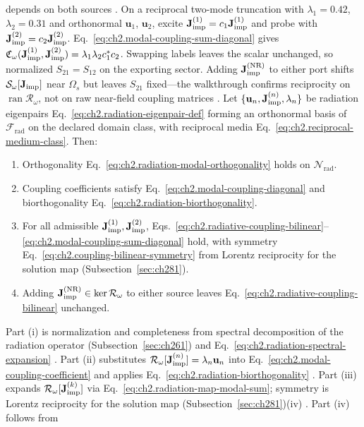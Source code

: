 depends on both sources \cite{stratton1941}. On a reciprocal two-mode truncation with $\lambda_1=0.42$, $\lambda_2=0.31$ and orthonormal $\mathbf{u}_1$, $\mathbf{u}_2$, excite $\mathbf{J}_{\mathrm{imp}}^{(1)}=c_1\mathbf{J}^{(1)}_{\mathrm{imp}}$ and probe with $\mathbf{J}_{\mathrm{imp}}^{(2)}=c_2\mathbf{J}^{(2)}_{\mathrm{imp}}$. Eq.~\eqref{eq:ch2.modal-coupling-sum-diagonal} gives $\mathfrak{C}_\omega(\mathbf{J}_{\mathrm{imp}}^{(1)},\mathbf{J}_{\mathrm{imp}}^{(2)})=\lambda_1\lambda_2 c_1^* c_2$. Swapping labels leaves the scalar unchanged, so normalized $S_{21}=S_{12}$ on the exporting sector. Adding $\mathbf{J}_{\mathrm{imp}}^{\mathrm{(NR)}}$ to either port shifts $\mathcal{S}_\omega[\mathbf{J}_{\mathrm{imp}}]$ near $\Omega_s$ but leaves $S_{21}$ fixed---the walkthrough confirms reciprocity on $\operatorname{ran}\mathcal{R}_\omega$, not on raw near-field coupling matrices \cite{stratton1941}.
\label{thm:ch2.radiation-modal-orthogonality-coupling}
Let \(\{\mathbf{u}_n,\mathbf{J}_{\mathrm{imp}}^{(n)},\lambda_n\}\) be radiation eigenpairs
Eq.~\eqref{eq:ch2.radiation-eigenpair-def} forming an orthonormal basis of
\(\mathcal{F}_{\mathrm{rad}}\) on the declared domain class, with reciprocal media
Eq.~\eqref{eq:ch2.reciprocal-medium-class}. Then:
\begin{enumerate}
\item[(i)] Orthogonality Eq.~\eqref{eq:ch2.radiation-modal-orthogonality} holds on
\(\mathcal{N}_{\mathrm{rad}}\).
\item[(ii)] Coupling coefficients satisfy Eq.~\eqref{eq:ch2.modal-coupling-diagonal} and
biorthogonality Eq.~\eqref{eq:ch2.radiation-biorthogonality}.
\item[(iii)] For all admissible \(\mathbf{J}_{\mathrm{imp}}^{(1)},\mathbf{J}_{\mathrm{imp}}^{(2)}\),
Eqs.~\eqref{eq:ch2.radiative-coupling-bilinear}--\eqref{eq:ch2.modal-coupling-sum-diagonal}
hold, with symmetry Eq.~\eqref{eq:ch2.coupling-bilinear-symmetry} from Lorentz reciprocity for the solution map (Subsection~\ref{sec:ch281}).
\item[(iv)] Adding \(\mathbf{J}_{\mathrm{imp}}^{\mathrm{(NR)}}\in\ker\mathcal{R}_\omega\) to either source leaves
Eq.~\eqref{eq:ch2.radiative-coupling-bilinear} unchanged.
\end{enumerate}
Part (i) is normalization and completeness from spectral decomposition of the radiation operator (Subsection~\ref{sec:ch261}) and
Eq.~\eqref{eq:ch2.radiation-spectral-expansion} \cite{stratton1941}. Part (ii) substitutes
\(\mathcal{R}_\omega[\mathbf{J}_{\mathrm{imp}}^{(n)}]=\lambda_n\mathbf{u}_n\) into
Eq.~\eqref{eq:ch2.modal-coupling-coefficient} and applies
Eq.~\eqref{eq:ch2.radiation-biorthogonality} \cite{stratton1941}. Part (iii)
expands \(\mathcal{R}_\omega[\mathbf{J}_{\mathrm{imp}}^{(k)}]\) via
Eq.~\eqref{eq:ch2.radiation-map-modal-sum}; symmetry is Lorentz reciprocity for the solution map (Subsection~\ref{sec:ch281})(iv) \cite{stratton1941}. Part (iv) follows from
